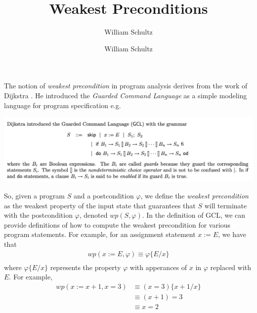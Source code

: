 \documentclass[10pt,a4paper]{article}
\author{William Schultz}
\begin{document}
\title{Weakest Preconditions}
\author{William Schultz}
\maketitle

The notion of \textit{weakest precondition} in program analysis derives from the work of Dijkstra \cite{1975dijkstrawp}. He introduced the \textit{Guarded Command Language} as a simple modeling language for program specification e.g.
\begin{center}
    \includegraphics[scale=0.3]{gcl_grammar.png}
\end{center}
So, given a program $S$ and a postcondition $\varphi$, we define the \textit{weakest precondition} as the weakest property of the input state that guarantees that $S$ will terminate with the postcondition $\varphi$, denoted $wp(S, \varphi)$. In the definition of GCL, we can provide definitions of how to compute the weakest precondition for various program statements. For example, for an assignment statement $x := E$, we have that
\begin{align*}
    wp(x := E, \varphi) \equiv \varphi\{E/x\} \\
\end{align*}
where $\varphi\{E/x\}$ represents the property $\varphi$ with apperances of $x$ in $\varphi$ replaced with $E$. For example,
\begin{align*}
    wp(x := x + 1, x = 3) &\equiv (x = 3)\{x+1/x\} \\
    & \equiv (x+1) = 3\\
    & \equiv x = 2\\
\end{align*}




\end{document}
